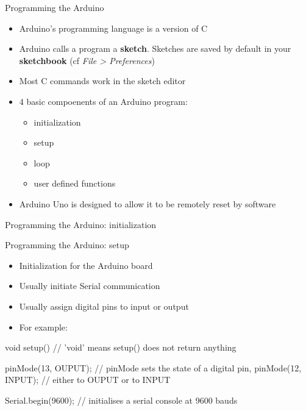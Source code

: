 \documentclass[compress]{beamer}
\begin{document}
    \begin{frame}{Programming the Arduino}
        \begin{itemize}
            \item Arduino's programming language is a version of C
            \item Arduino calls a program a \textbf{sketch}. Sketches are saved
                by default in your \textbf{sketchbook} (cf \emph{File >
                Preferences})
            \item Most C commands work in the sketch editor
            \item 4 basic compoenents of an Arduino program:
                \begin{itemize}
                    \item initialization
                    \item setup
                    \item loop
                    \item user defined functions
                \end{itemize}
            \item Arduino Uno is designed to allow it to be remotely reset by
                software

        \end{itemize}
    \end{frame}

{
    \begin{frame}{Programming the Arduino: initialization}
    \end{frame}
}

\begin{frame}[fragile]{Programming the Arduino: setup}
    \begin{itemize}
        \item Initialization for the Arduino board
        \item Usually initiate Serial communication
        \item Usually assign digital pins to input or output
        \item For example:
    \end{itemize}

            \begin{cppcode}
void setup() // 'void' means setup() does not return anything
{
    pinMode(13, OUPUT); // pinMode sets the state of a digital pin,
    pinMode(12, INPUT); // either to OUPUT or to INPUT

    Serial.begin(9600); // initialises a serial console at 9600 bauds
}

            \end{cppcode}
\end{frame}
\end{document}
